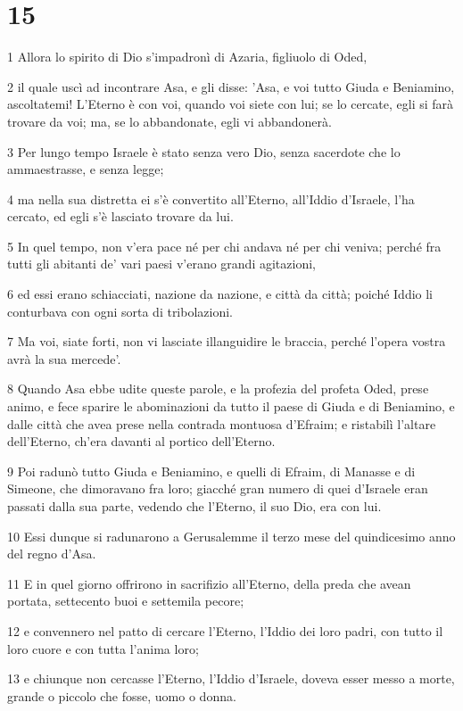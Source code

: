 \chapter{15}

\par 1 Allora lo spirito di Dio s'impadronì di Azaria, figliuolo di Oded,
\par 2 il quale uscì ad incontrare Asa, e gli disse: 'Asa, e voi tutto Giuda e Beniamino, ascoltatemi! L'Eterno è con voi, quando voi siete con lui; se lo cercate, egli si farà trovare da voi; ma, se lo abbandonate, egli vi abbandonerà.
\par 3 Per lungo tempo Israele è stato senza vero Dio, senza sacerdote che lo ammaestrasse, e senza legge;
\par 4 ma nella sua distretta ei s'è convertito all'Eterno, all'Iddio d'Israele, l'ha cercato, ed egli s'è lasciato trovare da lui.
\par 5 In quel tempo, non v'era pace né per chi andava né per chi veniva; perché fra tutti gli abitanti de' vari paesi v'erano grandi agitazioni,
\par 6 ed essi erano schiacciati, nazione da nazione, e città da città; poiché Iddio li conturbava con ogni sorta di tribolazioni.
\par 7 Ma voi, siate forti, non vi lasciate illanguidire le braccia, perché l'opera vostra avrà la sua mercede'.
\par 8 Quando Asa ebbe udite queste parole, e la profezia del profeta Oded, prese animo, e fece sparire le abominazioni da tutto il paese di Giuda e di Beniamino, e dalle città che avea prese nella contrada montuosa d'Efraim; e ristabilì l'altare dell'Eterno, ch'era davanti al portico dell'Eterno.
\par 9 Poi radunò tutto Giuda e Beniamino, e quelli di Efraim, di Manasse e di Simeone, che dimoravano fra loro; giacché gran numero di quei d'Israele eran passati dalla sua parte, vedendo che l'Eterno, il suo Dio, era con lui.
\par 10 Essi dunque si radunarono a Gerusalemme il terzo mese del quindicesimo anno del regno d'Asa.
\par 11 E in quel giorno offrirono in sacrifizio all'Eterno, della preda che avean portata, settecento buoi e settemila pecore;
\par 12 e convennero nel patto di cercare l'Eterno, l'Iddio dei loro padri, con tutto il loro cuore e con tutta l'anima loro;
\par 13 e chiunque non cercasse l'Eterno, l'Iddio d'Israele, doveva esser messo a morte, grande o piccolo che fosse, uomo o donna.
